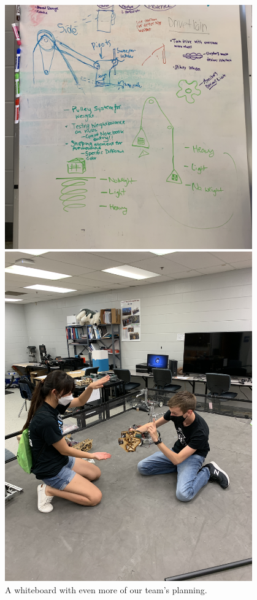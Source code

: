 \begin{figure}[ht]
\centering
\begin{minipage}[b]{.48\textwidth}
  \centering
  \includegraphics[width=0.95\textwidth]{Meetings/September/09-21-21/9-19-21_Team_Image5 - Nathan Forrer.JPG}
  \caption{A whiteboard with even more of our team's planning.}
  \label{fig:pic5}
\end{minipage}%
\hfill%
\begin{minipage}[b]{.48\textwidth}
  \centering
  \includegraphics[width=0.95\textwidth]{Meetings/September/09-21-21/9-19-21_Team_Image6 - Nathan Forrer.JPG}

\end{minipage}
\end{figure}
